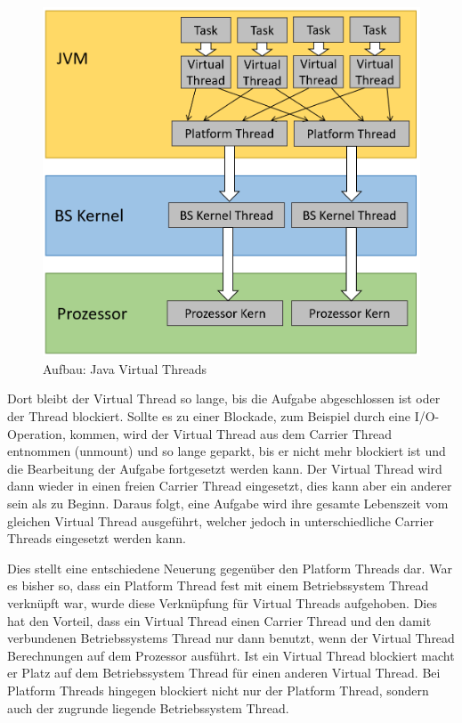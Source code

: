 \documentclass[fontsize=12pt,paper=a4,twoside=semi,parskip=half-,headsepline,headinclude]{scrreprt}
\begin{document}
\begin{figure}[h]
	\centering
	\includegraphics[scale=0.5]{figures/VirtualThreads.png}
	\caption{Aufbau: Java Virtual Threads}
	\label{fig:VirtualThreads}
\end{figure}

Dort bleibt der Virtual Thread so lange, bis die Aufgabe abgeschlossen ist oder der Thread blockiert. Sollte es zu einer Blockade, zum Beispiel durch eine I/O-Operation, kommen, wird der Virtual Thread aus dem Carrier Thread entnommen (unmount) und so lange geparkt, bis er nicht mehr blockiert ist und die Bearbeitung der Aufgabe fortgesetzt werden kann. Der Virtual Thread wird dann wieder in einen freien Carrier Thread eingesetzt, dies kann aber ein anderer sein als zu Beginn. Daraus folgt, eine Aufgabe wird ihre gesamte Lebenszeit vom gleichen Virtual Thread ausgeführt, welcher jedoch in unterschiedliche Carrier Threads eingesetzt werden kann. 

Dies stellt eine entschiedene Neuerung gegenüber den Platform Threads dar. War es bisher so, dass ein Platform Thread fest mit einem Betriebssystem Thread verknüpft war, wurde diese Verknüpfung für Virtual Threads aufgehoben. Dies hat den Vorteil, dass ein Virtual Thread einen Carrier Thread und den damit verbundenen Betriebssystems Thread nur dann benutzt, wenn der Virtual Thread Berechnungen auf dem Prozessor ausführt. Ist ein Virtual Thread blockiert macht er Platz auf dem Betriebssystem Thread für einen anderen Virtual Thread. Bei Platform Threads hingegen blockiert nicht nur der Platform Thread, sondern auch der zugrunde liegende Betriebssystem Thread. \cite{Bateman2023}
\end{document}
